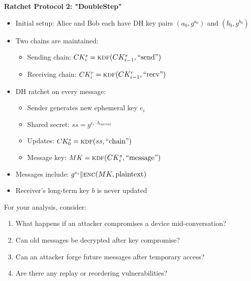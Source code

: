 \documentclass[10pt,a4paper,american]{article}
\begin{document}
\begin{enumerate}
	      \textbf{Ratchet Protocol 2: "DoubleStep"}
	      \begin{itemize}
		      \item Initial setup: Alice and Bob each have DH key pairs $(a_0, g^{a_0})$ and $(b_0, g^{b_0})$
		      \item Two chains are maintained:
		            \begin{itemize}
			            \item Sending chain: $CK^s_i = \func{kdf}{CK^s_{i-1}, \text{``send''}}$
			            \item Receiving chain: $CK^r_i = \func{kdf}{CK^r_{i-1}, \text{``recv''}}$
		            \end{itemize}
		      \item DH ratchet on every message:
		            \begin{itemize}
			            \item Sender generates new ephemeral key $e_i$
			            \item Shared secret: $ss = g^{e_i \cdot b_{current}}$
			            \item Updates: $CK^s_0 = \func{kdf}{ss, \text{``chain''}}$
			            \item Message key: $MK = \func{kdf}{CK^s_i, \text{``message''}}$
		            \end{itemize}
		      \item Messages include: $g^{e_i} \| \func{enc}{MK, \text{plaintext}}$
		      \item Receiver's long-term key $b$ is never updated
	      \end{itemize}

	      For your analysis, consider:
	      \begin{enumerate}
		      \item What happens if an attacker compromises a device mid-conversation?
		      \item Can old messages be decrypted after key compromise?
		      \item Can an attacker forge future messages after temporary access?
		      \item Are there any replay or reordering vulnerabilities?
	      \end{enumerate}
\end{enumerate}
\end{document}
